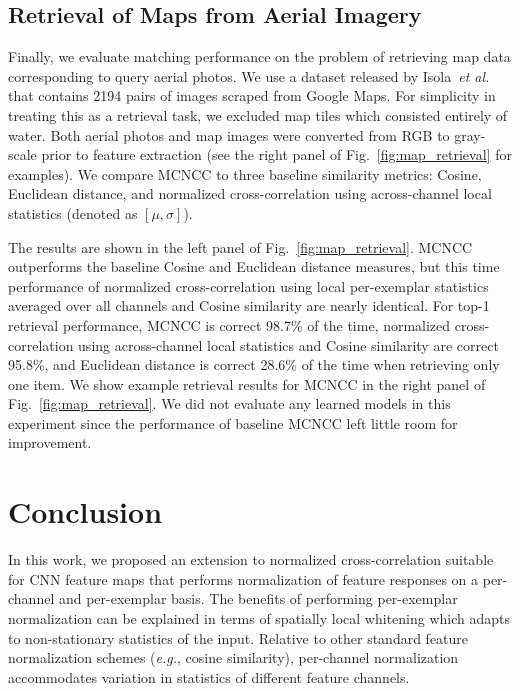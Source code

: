 \documentclass[twocolumn]{svjour3}           %
\newcommand{\eg}{\emph{e.g.}}
\newcommand{\etal}{\emph{et al.}}
\begin{document}
\subsection{Retrieval of Maps from Aerial Imagery}
Finally, we evaluate matching performance on the problem of retrieving map data
corresponding to query aerial photos.  We use a dataset released by
Isola~\etal~\cite{isola2017image} that contains 2194 pairs of images scraped
from Google Maps. For simplicity in treating this as a retrieval task, we
excluded map tiles which consisted entirely of water.  Both aerial photos and
map images were converted from RGB to gray-scale prior to feature extraction
(see the right panel of Fig.~\ref{fig:map_retrieval} for examples).  We compare MCNCC to
three baseline similarity metrics: Cosine, Euclidean distance, and normalized
cross-correlation using across-channel local statistics (denoted as $[\mu,\sigma]$).

The results are shown in the left panel of Fig.~\ref{fig:map_retrieval}.  MCNCC
outperforms the baseline Cosine and Euclidean distance measures, but this time
performance of normalized cross-correlation using local per-exemplar statistics
averaged over all channels and Cosine similarity are nearly identical.  For
top-1 retrieval performance, MCNCC is correct 98.7\% of the time, normalized
cross-correlation using across-channel local statistics and Cosine similarity
are correct 95.8\%, and Euclidean distance is correct 28.6\% of the time when
retrieving only one item.  We show example retrieval results for MCNCC in the
right panel of Fig.~\ref{fig:map_retrieval}. We did not evaluate any learned
models in this experiment since the performance of baseline MCNCC left little
room for improvement.



\section{Conclusion}

In this work, we proposed an extension to normalized cross-correlation suitable
for CNN feature maps that performs normalization of feature responses on a
per-channel and per-exemplar basis. The benefits of performing per-exemplar
normalization can be explained in terms of spatially local whitening which
adapts to non-stationary statistics of the input.  Relative to other standard
feature normalization schemes (\eg, cosine similarity), per-channel
normalization accommodates variation in statistics of different feature
channels. 
\end{document}
